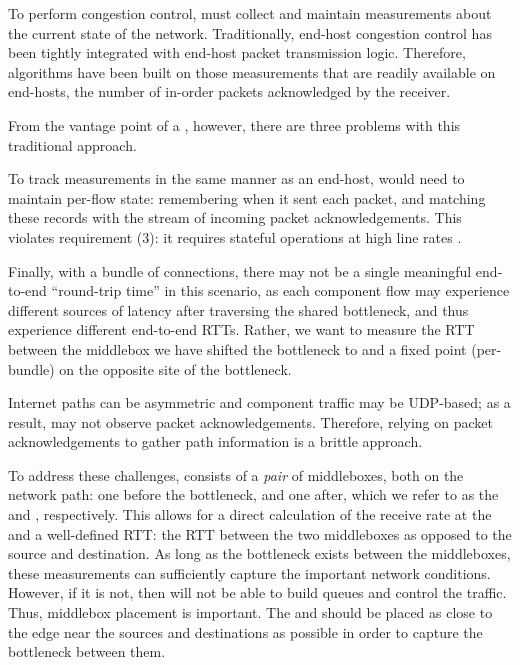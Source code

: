 \label{s:design:twosided}
To perform congestion control, \name must collect and maintain measurements about the current state of the network.
Traditionally, end-host congestion control has been tightly integrated with end-host packet transmission logic. 
Therefore, algorithms have been built on those measurements that are readily available on end-hosts, \eg the number of in-order packets acknowledged by the receiver.

From the vantage point of a \name, however, there are three problems with this traditional approach.

 To track measurements in the same manner as an end-host, \name would need to maintain per-flow state: remembering when it sent each packet, and matching these records with the stream of incoming packet acknowledgements. 
This violates requirement (3): it requires stateful operations at high line rates . 

 Finally, with a bundle of connections, there may not be a single meaningful end-to-end ``round-trip time'' in this scenario, as each component flow may experience different sources of latency after traversing the shared bottleneck, and thus experience different end-to-end RTTs. 
Rather, we want to measure the RTT between the middlebox we have shifted the bottleneck to and a fixed point (per-bundle) on the opposite site of the bottleneck.

 Internet paths can be asymmetric and component traffic may be UDP-based; as a result, \name may not observe packet acknowledgements. Therefore, relying on packet acknowledgements to gather path information is a brittle approach.

To address these challenges, \name consists of a \emph{pair} of middleboxes, both on the network path: one before the bottleneck, and one after, which we refer to as the \textit{\inbox} and \textit{\outbox}, respectively. 
This allows for a direct calculation of the receive rate at the \outbox and a well-defined RTT: the RTT between the two middleboxes as opposed to the source and destination. 
As long as the bottleneck exists between the middleboxes, these measurements can sufficiently capture the important network conditions. 
However, if it is not, then \name will not be able to build queues and control the traffic. Thus, middlebox placement is important. The \inbox and \outbox should be placed as close to the edge near the sources and destinations as possible in order to capture the bottleneck between them.
 

